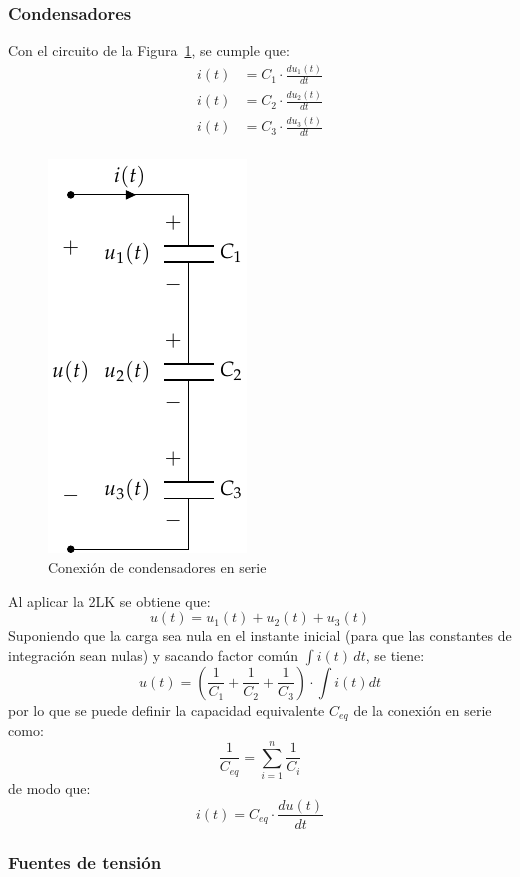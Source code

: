 \documentclass[11pt]{book} %
\begin{document}
		\subsubsection{Condensadores}
		Con el circuito de la Figura~\ref{fig.condensadores-serie}, se cumple que:
		\begin{align*}
			i(t) &= C_1 \cdot \frac{du_1(t)}{dt}\\
			i(t) &= C_2 \cdot \frac{du_2(t)}{dt}\\
			i(t) &= C_3 \cdot \frac{du_3(t)}{dt}\\
		\end{align*}
		\begin{figure}[htbp]
			\centering
			\includegraphics[width=0.2\linewidth]{../figs/CondensadoresSerie.pdf}
			\caption{Conexión de condensadores en serie}
			\label{fig.condensadores-serie}
		\end{figure}
		Al aplicar la 2LK se obtiene que: 
		\begin{equation*}
			u(t) = u_1(t) + u_2(t) + u_3(t)
		\end{equation*}
		Suponiendo que la carga sea nula en el instante inicial (para que las constantes de integración sean nulas) y sacando factor común $\int i(t)\,dt$, se tiene:
		\begin{equation*}
			u(t)=\left(\dfrac{1}{C_1}+\dfrac{1}{C_2}+\dfrac{1}{C_3} \right)\cdot \int i(t) dt
		\end{equation*}
		por lo que se puede definir la capacidad equivalente $C_{eq}$ de la conexión en serie como:
		\begin{equation}
			\boxed{\dfrac{1}{C_{eq}} = \sum_{i = 1}^n \dfrac{1}{C_i}}
		\end{equation}
		de modo que:
		\begin{equation*}
			i(t) = C_{eq} \cdot \frac{du(t)}{dt}
		\end{equation*}
		
		\subsubsection{Fuentes de tensión}
		
\end{document}
